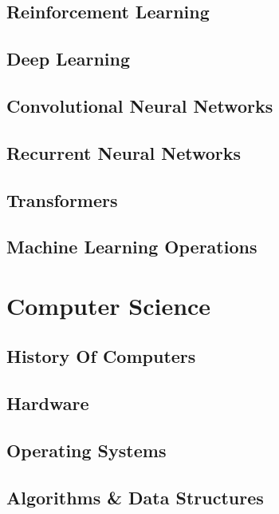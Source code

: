 \documentclass[a4paper, notitlepage]{report}
\begin{document}
\chapter{Reinforcement Learning}


\chapter{Deep Learning}


\chapter{Convolutional Neural Networks}


\chapter{Recurrent Neural Networks}


\chapter{Transformers}


\chapter{Machine Learning Operations}


\part{Computer Science}

\chapter{History Of Computers}


\chapter{Hardware}


\chapter{Operating Systems}


\chapter{Algorithms \& Data Structures}

\end{document}
